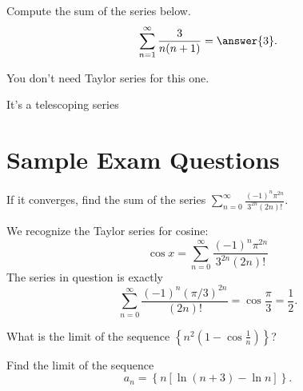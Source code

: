 \documentclass{ximera}
\begin{document}
\begin{exercise}
Compute the sum of the series below.
\[ \sum_{n=1}^\infty \frac{3}{n(n+1)} = \answer{3}. \]
\begin{hint}
You don't need Taylor series for this one.
\end{hint}
\begin{hint}
It's a telescoping series
\end{hint}
\end{exercise}

\section*{Sample Exam Questions}

\begin{question}%

If it converges, find the sum of the series \(\displaystyle \sum_{n=0}^\infty \frac{(-1)^n \pi^{2n}}{3^{2n} (2n)!}\). 
\begin{multiplechoice}
\end{multiplechoice}
\begin{feedback}
We recognize the Taylor series for cosine:
\[ \cos x = \sum_{n=0}^\infty \frac{(-1)^n \pi^{2n}}{3^{2n}(2n)!} \]
The series in question is exactly
\[ \sum_{n=0}^\infty \frac{(-1)^n (\pi/3)^{2n}}{(2n)!} = \cos \frac{\pi}{3} = \frac{1}{2}. \]
\end{feedback}

\end{question}

\begin{question}%

What is the limit of the sequence \(\displaystyle \left\{ n^2 \left( 1 - \cos \frac{1}{n} \right) \right\}\)?
\begin{multiplechoice}
\end{multiplechoice}

\end{question}

\begin{question}%

Find the limit of the sequence
\[ a_n = \left\{ n \left[ \ln (n+3) - \ln n \right] \right\}. \]
\begin{multiplechoice}
\choice{\(\infty\)}
\end{multiplechoice}

\end{question}
\end{document}

